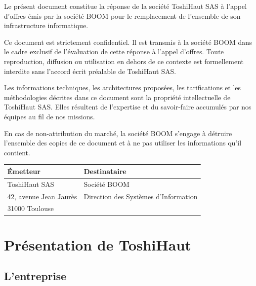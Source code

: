 \documentclass[12pt,a4paper]{report}
\begin{document}
Le présent document constitue la réponse de la société ToshiHaut SAS à l'appel d'offres émis par la société BOOM pour le remplacement de l'ensemble de son infrastructure informatique.

Ce document est strictement confidentiel. Il est transmis à la société BOOM dans le cadre exclusif de l'évaluation de cette réponse à l'appel d'offres. Toute reproduction, diffusion ou utilisation en dehors de ce contexte est formellement interdite sans l'accord écrit préalable de ToshiHaut SAS.

Les informations techniques, les architectures proposées, les tarifications et les méthodologies décrites dans ce document sont la propriété intellectuelle de ToshiHaut SAS. Elles résultent de l'expertise et du savoir-faire accumulés par nos équipes au fil de nos missions.

En cas de non-attribution du marché, la société BOOM s'engage à détruire l'ensemble des copies de ce document et à ne pas utiliser les informations qu'il contient.

\vspace{2cm}
\begin{center}
\begin{tabular}{|p{6cm}|p{6cm}|}
\hline
\textbf{Émetteur} & \textbf{Destinataire} \\
\hline
ToshiHaut SAS & Société BOOM \\
42, avenue Jean Jaurès & Direction des Systèmes d'Information \\
31000 Toulouse & \\
\hline
\end{tabular}
\end{center}

\newpage

\tableofcontents
\newpage
\listoffigures
\newpage
\listoftables
\newpage

\chapter{Présentation de ToshiHaut}

\section{L'entreprise}
\end{document}
